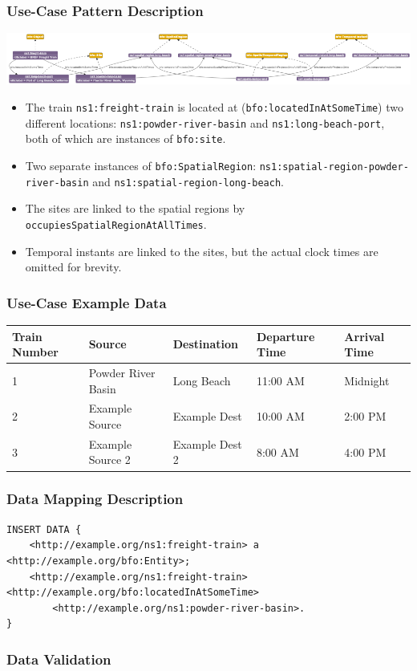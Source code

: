 \subsubsection*{Use-Case Pattern Description}
\includegraphics[scale=0.45]{scenarios/location-change/images/change-location-usecase1.png}
\begin{itemize}
    \item The train \texttt{ns1:freight-train} is located at (\texttt{bfo:locatedInAtSomeTime}) two different locations: \texttt{ns1:powder-river-basin} and \texttt{ns1:long-beach-port}, both of which are instances of \texttt{bfo:site}.
    \item Two separate instances of \texttt{bfo:SpatialRegion}: \texttt{ns1:spatial-region-powder-river-basin} and \texttt{ns1:spatial-region-long-beach}.
    \item The sites are linked to the spatial regions by \texttt{occupiesSpatialRegionAtAllTimes}.
    \item Temporal instants are linked to the sites, but the actual clock times are omitted for brevity.
\end{itemize}

\subsubsection*{Use-Case Example Data}

\begin{tabularx}{\textwidth}{|X|l|X|X|X|}
\hline
Train Number & Source & Destination & Departure Time & Arrival Time \\
\hline
1            & Powder River Basin & Long Beach      & 11:00 AM      & Midnight       \\
2            & Example Source     & Example Dest    & 10:00 AM      & 2:00 PM        \\
3            & Example Source 2   & Example Dest 2  & 8:00 AM       & 4:00 PM        \\
\hline
\end{tabularx}

\subsubsection*{Data Mapping Description}

\begin{verbatim}
INSERT DATA {
    <http://example.org/ns1:freight-train> a <http://example.org/bfo:Entity>;
    <http://example.org/ns1:freight-train> <http://example.org/bfo:locatedInAtSomeTime> 
        <http://example.org/ns1:powder-river-basin>.
}
\end{verbatim}

\subsubsection*{Data Validation}